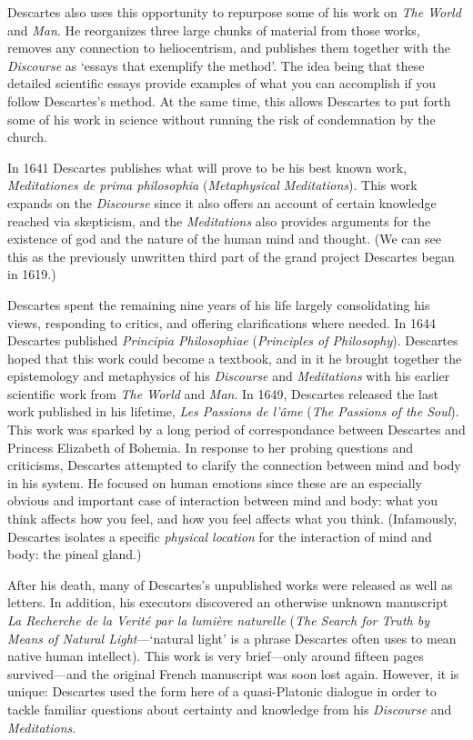 Descartes also uses this opportunity to repurpose some of his work on \textit{The World} and \textit{Man}. He reorganizes three large chunks of material from those works, removes any connection to heliocentrism, and publishes them together with the \textit{Discourse} as `essays that exemplify the method'. The idea being that these detailed scientific essays provide examples of what you can accomplish if you follow Descartes's method. At the same time, this allows Descartes to put forth some of his work in science without running the risk of condemnation by the church.

In 1641 Descartes publishes what will prove to be his best known work, \textit{Meditationes de prima philosophia} (\textit{Metaphysical Meditations}). This work expands on the \textit{Discourse} since it also offers an account of certain knowledge reached via skepticism, and the \textit{Meditations} also provides arguments for the existence of god and the nature of the human mind and thought. (We can see this as the previously unwritten third part of the grand project Descartes began in 1619.)

Descartes spent the remaining nine years of his life largely consolidating his views, responding to critics, and offering clarifications where needed. In 1644 Descartes published \textit{Principia Philosophiae} (\textit{Principles of Philosophy}). Descartes hoped that this work could become a textbook, and in it he brought together the epistemology and metaphysics of his \textit{Discourse} and \textit{Meditations} with his earlier scientific work from \textit{The World} and \textit{Man}. In 1649, Descartes released the last work published in his lifetime, \textit{Les Passions de l'âme} (\textit{The Passions of the Soul}). This work was sparked by a long period of correspondance between Descartes and Princess Elizabeth of Bohemia. In response to her probing questions and criticisms, Descartes attempted to clarify the connection between mind and body in his system. He focused on human emotions since these are an especially obvious and important case of interaction between mind and body: what you think affects how you feel, and how you feel affects what you think. (Infamously, Descartes isolates a specific \textit{physical location} for the interaction of mind and body: the pineal gland.)

After his death, many of Descartes's unpublished works were released as well as letters. In addition, his executors discovered an otherwise unknown manuscript \textit{La Recherche de la Verité par la lumière naturelle} (\textit{The Search for Truth by Means of Natural Light}---`natural light' is a phrase Descartes often uses to mean native human intellect). This work is very brief---only around fifteen pages survived---and the original French manuscript was soon lost again. However, it is unique: Descartes used the form here of a quasi-Platonic dialogue in order to tackle familiar questions about certainty and knowledge from his \textit{Discourse} and \textit{Meditations}.

